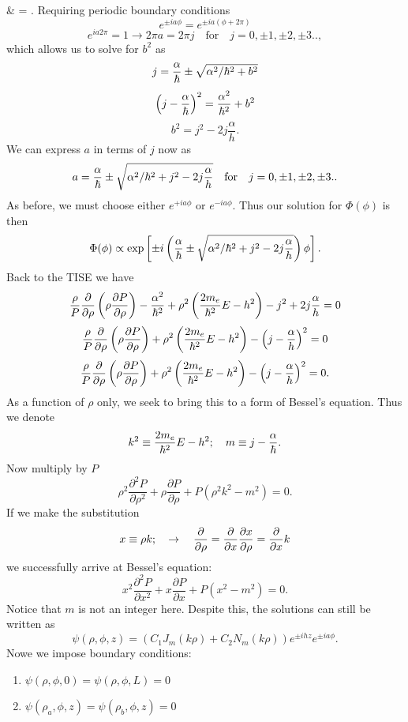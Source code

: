 \documentclass[11pt,letterpaper]{article}
\begin{document}
			& = \frac{\alpha}{\h}\pm{}.
		\ea
		Requiring periodic boundary conditions
		\[
			e^{\pm ia\phi} = e^{\pm ia(\phi+2\pi)}
		\]
		\[
			e^{ia2\pi} = 1 \to 2\pi a = 2\pi j\quad\text{for}\quad j = 0,\pm1,\pm2,\pm3..,
		\]
		which allows us to solve for $b^2$ as
		\[
			j = \frac{\alpha}{\h}\pm\sqrt{\alpha^2/\h^2+b^2}
		\]
		\[
			\plr{j-\frac{\alpha}{\h}}^2 = \frac{\alpha^2}{\h^2}+b^2
		\]
		\[
			b^2 = j^2 -2j\frac{\alpha}{h}.
		\]
		We can express $a$ in terms of $j$ now as
		\[
			a = \frac{\alpha}{\h}\pm\sqrt{\alpha^2/\h^2+j^2 -2j\frac{\alpha}{h}}\quad\text{for}\quad j = 0,\pm1,\pm2,\pm3..
		\]
		As before, we must choose either $e^{+ia\phi}$ or $e^{-ia\phi}$. Thus our solution for $\Phi(\phi)$ is then
		\[
			\Phi(\phi) \propto \exp\blr{\pm i \plr{\frac{\alpha}{\h}\pm\sqrt{\alpha^2/\h^2+j^2 -2j\frac{\alpha}{h}}}\phi}.
		\]
		Back to the TISE we have
		\[
			\frac {\rho}{P} \frac{\partial}{\partial \rho}\left(\rho\frac{\partial P}{\partial\rho}\right) - \frac{\alpha^2}
			{\h^2}+\rho^2\plr{\frac{2m_e}{\h^2}E - h^2} -j^2 +2j\frac{\alpha}{h}= 0 
		\]
		\[
			\frac {\rho}{P} \frac{\partial}{\partial \rho}\left(\rho\frac{\partial P}{\partial\rho}\right)+\rho^2\plr{\frac{2m_e}{\h^2}E - h^2}
			-\plr{j-\frac{\alpha}{h}}^2= 0 
		\]
		\[
			\frac {\rho}{P} \frac{\partial}{\partial \rho}\left(\rho\frac{\partial P}{\partial\rho}\right)+\rho^2\plr{\frac{2m_e}{\h^2}E - h^2}
			-\plr{j-\frac{\alpha}{h}}^2= 0 .
		\]
		As a function of $\rho$ only, we seek to bring this to a form of Bessel's equation. Thus we denote
		\[
			k^2 \equiv \frac{2m_e}{\h^2}E-h^2;\quad m \equiv j-\frac{\alpha}{\h}.
		\]
		Now multiply by $P$
		\[
			\rho^2 \frac{\partial^2 P}{\partial \rho^2}+\rho\frac{\partial P}{\partial\rho}+P(\rho^2k^2-m^2)= 0 .
		\]
		If we make the substitution 
		\[
			x\equiv \rho k;\quad \to \quad \pdiff{\rho} = \pdiff{x}\pdiff[x]{\rho}=\pdiff{x}k
		\]
		we successfully arrive at Bessel's equation:
		\[
			x^2 \frac{\partial^2 P}{\partial x^2}+x\frac{\partial P}{\partial x}+P(x^2-m^2)= 0 .
		\]
		Notice that $m$ is not an integer here. Despite this, the solutions can still be written as
                \[
                		\psi(\rho,\phi,z) = (C_1J_m(k\rho)+C_2N_m(k\rho))e^{\pm ihz}e^{\pm ia\phi}.
		\]
		Nowe we impose boundary conditions:
		  \begin{enumerate}
               		 \item $\psi(\rho,\phi,0) = \psi(\rho,\phi,L) = 0$
              		  \item $\psi(\rho_a,\phi,z)=\psi(\rho_b,\phi,z) = 0$
              	  \end{enumerate}
\end{document}
